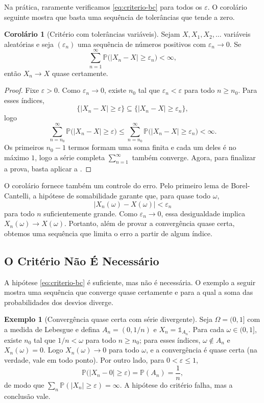 \documentclass[12pt,portuguese]{article}
\theoremstyle{definition}
\newtheorem{example}[example]{Exemplo}
\newtheorem{corollary}[corollary]{Corolário}
\theoremstyle{plainexercise}
\theoremstyle{starredexercise}
\theoremstyle{definition}
\begin{document}
Na prática, raramente verificamos \eqref{eq:criterio-bc} para todos os
$\varepsilon$. O corolário seguinte mostra que basta uma sequência de
tolerâncias que tende a zero.

\begin{corollary}[Critério com tolerâncias variáveis]\label{cor:criterio-bc-epsn}
Sejam $X,X_1,X_2,\ldots$ variáveis aleatórias e seja $(\varepsilon_n)$ uma
sequência de números positivos com $\varepsilon_n\to0$. Se
\[
\sum_{n=1}^{\infty}\mathbb{P}\bigl(|X_n-X|\geqslant\varepsilon_n\bigr)<\infty,
\]
então $X_n\to X$ quase certamente.
\end{corollary}

\begin{proof}
Fixe $\varepsilon>0$. Como $\varepsilon_n\to0$, existe $n_0$ tal que
$\varepsilon_n<\varepsilon$ para todo $n\geqslant n_0$. Para esses índices,
\[
\bigl\{|X_n-X|\geqslant\varepsilon\bigr\}
\subseteq
\bigl\{|X_n-X|\geqslant\varepsilon_n\bigr\},
\]
logo
\[
\sum_{n=n_0}^{\infty}\mathbb{P}\bigl(|X_n-X|\geqslant\varepsilon\bigr)
\leqslant
\sum_{n=n_0}^{\infty}\mathbb{P}\bigl(|X_n-X|\geqslant\varepsilon_n\bigr)
<\infty.
\]
Os primeiros $n_0-1$ termos formam uma soma finita e cada um deles é no máximo
$1$, logo a série completa $\sum_{n=1}^{\infty}$ também converge. 
Agora, para finalizar a prova, basta aplicar a
.
\end{proof}

O corolário fornece também um controle do erro. Pelo primeiro lema de
Borel-Cantelli, a hipótese de somabilidade garante que, para quase todo
$\omega$,
\[
|X_n(\omega)-X(\omega)|<\varepsilon_n
\]
para todo $n$ suficientemente grande. Como $\varepsilon_n\to0$, essa
desigualdade implica $X_n(\omega)\to X(\omega)$. Portanto, além de provar a
convergência quase certa, obtemos uma sequência que limita o erro a partir
de algum índice.

\subsection{O Critério Não É Necessário}\label{subsec:qc-nao-necessario}

A hipótese \eqref{eq:criterio-bc} é suficiente, mas não é necessária. O exemplo
a seguir mostra uma sequência que converge quase certamente e para a qual a
soma das probabilidades dos desvios diverge.

\begin{example}[Convergência quase certa com série divergente]\label{ex:qc-serie-divergente}
Seja $\Omega=(0,1]$ com a medida de Lebesgue e defina $A_n=(0,1/n)$ e
$X_n=\mathds{1}_{A_n}$. Para cada $\omega\in(0,1]$, existe $n_0$ tal que
$1/n<\omega$ para todo $n\geqslant n_0$; para esses índices, $\omega\notin A_n$
e $X_n(\omega)=0$. Logo $X_n(\omega)\to0$ para todo $\omega$, e a convergência
é quase certa (na verdade, vale em todo ponto). Por outro lado, para
$0<\varepsilon\leqslant1$,
\[
\mathbb{P}\bigl(|X_n-0|\geqslant\varepsilon\bigr)=\mathbb{P}(A_n)=\frac{1}{n},
\]
de modo que $\sum_n\mathbb{P}(|X_n|\geqslant\varepsilon)=\infty$. A hipótese do
critério falha, mas a conclusão vale.
\end{example}
\end{document}
